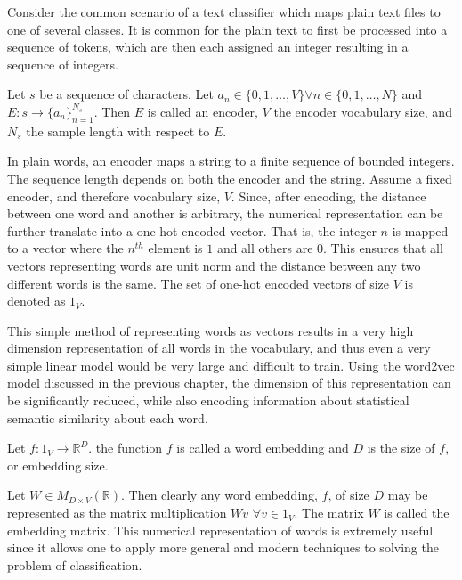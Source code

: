 Consider the common scenario of a text classifier which maps plain text files to one of several classes.  It is common for the plain text to first be processed into a sequence of tokens, which are then each assigned an integer resulting in a sequence of integers.

\begin{definition}
Let $s$ be a sequence of characters.  Let $a_n \in \{0,1,\dots,V\} \forall n \in \{0,1,\dots,N\}$ and $E:s\rightarrow \{a_n\}_{n=1}^{N_s}$.  Then $E$ is called an encoder, $V$ the encoder vocabulary size, and $N_s$ the sample length with respect to $E$.
\end{definition}

In plain words, an encoder maps a string to a finite sequence of bounded integers.  The sequence length depends on both the encoder and the string.  Assume a fixed encoder, and therefore vocabulary size, $V$.  Since, after encoding, the distance between one word and another is arbitrary, the numerical representation can be further translate into a one-hot encoded vector.  That is, the integer $n$ is mapped to a vector where the $n^{th}$ element is $1$ and all others are $0$.  This ensures that all vectors representing words are unit norm and the distance between any two different words is the same.  The set of one-hot encoded vectors of size $V$ is denoted as $1_V$.

This simple method of representing words as vectors results in a very high dimension representation of all words in the vocabulary, and thus even a very simple linear model would be very large and difficult to train.  Using the word2vec model discussed in the previous chapter, the dimension of this representation can be significantly reduced, while also encoding information about statistical semantic similarity about each word.

\begin{definition}
Let $f: 1_V \rightarrow \mathbb{R}^D$.  the function $f$ is called a word embedding and $D$ is the size of $f$, or embedding size.
\end{definition}

\noindent
Let $W \in M_{D\times V}(\mathbb{R})$.  Then clearly any word embedding, $f$, of size $D$ may be represented as the matrix multiplication $Wv$ $\forall v \in 1_V$.  The matrix $W$ is called the embedding matrix.  This numerical representation of words is extremely useful since it allows one to apply more general and modern techniques to solving the problem of classification.
